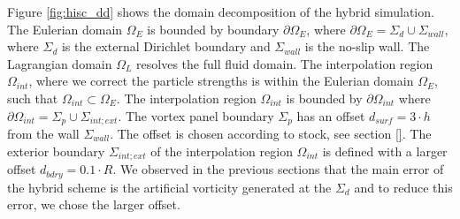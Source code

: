 
Figure \ref{fig:hisc_dd} shows the domain decomposition of the hybrid simulation. The Eulerian domain $\Omega_E$ is bounded by boundary $\partial\Omega_E$, where $\partial\Omega_E=\Sigma_d\cup\Sigma_{wall}$, where $\Sigma_d$ is the external Dirichlet boundary and $\Sigma_{wall}$ is the no-slip wall. The Lagrangian domain $\Omega_L$ resolves the full fluid domain. The interpolation region $\Omega_{int}$, where we correct the particle strengths is within the Eulerian domain $\Omega_E$, such that $\Omega_{int}\subset\Omega_E$. The interpolation region $\Omega_{int}$ is bounded by $\partial\Omega_{int}$ where $\partial\Omega_{int}=\Sigma_p\cup\Sigma_{int;ext}$. The vortex panel boundary $\Sigma_p$ has an offset $d_{surf}=3\cdot{h}$ from the wall $\Sigma_{wall}$. The offset is chosen according to stock, see section \ref{}. The exterior boundary $\Sigma_{int;ext}$ of the interpolation region $\Omega_{int}$ is defined with a larger offset $d_{bdry} = 0.1\cdot{R}$. We observed in the previous sections that the main error of the hybrid scheme is the artificial vorticity generated at the $\Sigma_d$ and to reduce this error, we chose the larger offset.

